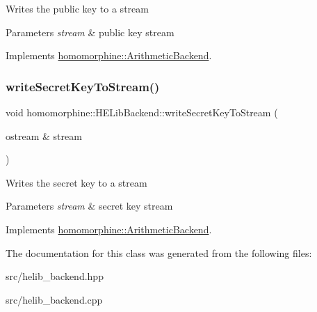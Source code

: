 Writes the public key to a stream


\begin{DoxyParams}{Parameters}
{\em stream} & public key stream \\
\hline
\end{DoxyParams}


Implements \hyperlink{classhomomorphine_1_1_arithmetic_backend_a2552b81a08e286969a0ff44428d59af4}{homomorphine\+::\+Arithmetic\+Backend}.

\mbox{\label{classhomomorphine_1_1_h_e_lib_backend_ac20314b484b23a46ff2070445576f413}} 
\subsubsection{\texorpdfstring{write\+Secret\+Key\+To\+Stream()}{writeSecretKeyToStream()}}
{\footnotesize\ttfamily void homomorphine\+::\+H\+E\+Lib\+Backend\+::write\+Secret\+Key\+To\+Stream (\begin{DoxyParamCaption}\item[{ostream \&}]{stream }\end{DoxyParamCaption})\hspace{0.3cm}{\ttfamily [virtual]}}

Writes the secret key to a stream


\begin{DoxyParams}{Parameters}
{\em stream} & secret key stream \\
\hline
\end{DoxyParams}


Implements \hyperlink{classhomomorphine_1_1_arithmetic_backend_ad88c797bbb2073ed3af460e568725c3f}{homomorphine\+::\+Arithmetic\+Backend}.



The documentation for this class was generated from the following files\+:\begin{DoxyCompactItemize}
\item 
src/helib\+\_\+backend.\+hpp\item 
src/helib\+\_\+backend.\+cpp\end{DoxyCompactItemize}
